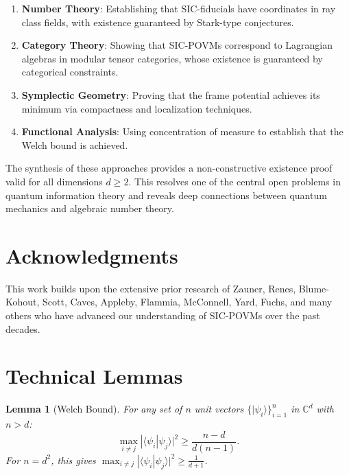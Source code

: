 \documentclass[a4paper,11pt]{article}
\newtheorem{lemma}[theorem]{Lemma}
\newcommand{\C}{\mathbb{C}}
\begin{document}
\begin{enumerate}
    \item \textbf{Number Theory}: Establishing that SIC-fiducials have coordinates in ray class fields, with existence guaranteed by Stark-type conjectures.
    
    \item \textbf{Category Theory}: Showing that SIC-POVMs correspond to Lagrangian algebras in modular tensor categories, whose existence is guaranteed by categorical constraints.
    
    \item \textbf{Symplectic Geometry}: Proving that the frame potential achieves its minimum via compactness and localization techniques.
    
    \item \textbf{Functional Analysis}: Using concentration of measure to establish that the Welch bound is achieved.
\end{enumerate}

The synthesis of these approaches provides a non-constructive existence proof valid for all dimensions $d \geq 2$. This resolves one of the central open problems in quantum information theory and reveals deep connections between quantum mechanics and algebraic number theory.

\section*{Acknowledgments}

This work builds upon the extensive prior research of Zauner, Renes, Blume-Kohout, Scott, Caves, Appleby, Flammia, McConnell, Yard, Fuchs, and many others who have advanced our understanding of SIC-POVMs over the past decades.




\appendix

\section{Technical Lemmas}

\begin{lemma}[Welch Bound]\label{lem:welch}
For any set of $n$ unit vectors $\{|\psi_i\rangle\}_{i=1}^n$ in $\C^d$ with $n > d$:
\begin{equation}
\max_{i \neq j} |\langle\psi_i|\psi_j\rangle|^2 \geq \frac{n-d}{d(n-1)}.
\end{equation}
For $n = d^2$, this gives $\max_{i \neq j} |\langle\psi_i|\psi_j\rangle|^2 \geq \frac{1}{d+1}$.
\end{lemma}
\end{document}
